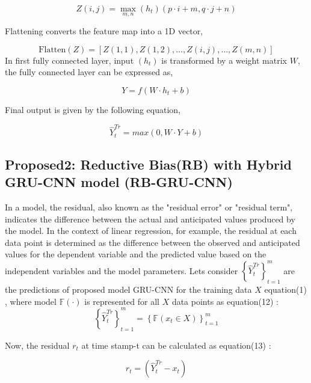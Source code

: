 \documentclass[a4paper, fleqn]{cas-sc}
\begin{document}
\begin{equation}
  Z(i,  j) = \max_{m,  n} (h_t)(p \cdot i + m,  q \cdot j + n)
  \end{equation}

Flattening converts the feature map into a 1D vector, 

  \begin{equation}
  \text{Flatten}(Z) = [Z(1,  1),  Z(1,  2),  \ldots,  Z(i,  j),  \ldots,  Z(m,  n)]
  \end{equation}
In first fully connected layer,  input $(h_t)$ is transformed by a weight matrix \(W\),  the fully connected layer can be expressed as, 

\begin{equation}
  Y = f(W\cdot h_t + b)
\end{equation}

Final output is given by the following equation, 

   
\begin{equation}
   \hat Y_{t}^{Tr} = max(0  ,   W \cdot Y + b)
\end{equation}

\subsection{Proposed2: Reductive Bias(RB) with Hybrid GRU-CNN model (RB-GRU-CNN)}


In a model,  the residual,  also known as the "residual error" or "residual term",  indicates the difference between the actual and anticipated values produced by the model. In the context of linear regression,  for example,  the residual at each data point is determined as the difference between the observed and anticipated values for the dependent variable and the predicted value based on the independent variables and the model parameters. Lets consider $ \left \{ \hat Y_{t}^{Tr} \right \}_{t=1}^m$ are the predictions of proposed model GRU-CNN for the training data $X$ equation(1) ,  where model $\mathbb{F}(\cdot)$ is represented for all $X$ data points as equation(12) :
\begin{equation}
 \left \{ \hat Y_{t}^{Tr} \right \}_{t=1}^m =  \left \{ \mathbb{F} (x_{t}\in X) \right \}_{t=1}^m
\end{equation}

Now,  the residual $r_{t}$ at time stamp-t can be calculated as equation(13) :

\begin{equation}
    r_{t} = (\hat Y_{t}^{Tr}- x_{t})
\end{equation}
\end{document}
